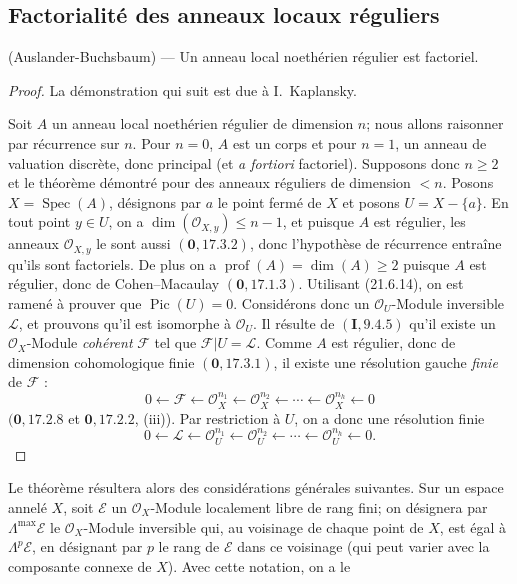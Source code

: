 \subsection{Factorialité des anneaux locaux réguliers}
\label{subsection:IV.21.11}
\label{IV.21.11}

\begin{theorem}[21.11.1]
\label{IV.21.11.1}
\textup{(Auslander-Buchsbaum)} ---
Un anneau local noethérien régulier est factoriel.
\end{theorem}

\begin{proof}
La démonstration qui suit est due à I.~Kaplansky.

Soit $A$ un anneau local noethérien régulier de dimension $n$; nous allons raisonner
par récurrence sur $n$. Pour $n=0$, $A$ est un corps et pour $n=1$, un anneau de
valuation discrète, donc principal (et \emph{a fortiori} factoriel). Supposons donc
$n\geq2$ et le théorème démontré pour des anneaux réguliers de dimension $<n$.
Posons $X=\operatorname{Spec}(A)$, désignons par $a$ le point fermé de $X$ et posons
$U=X-\{a\}$. En tout point $y\in U$, on a
$\dim(\mathcal O_{X,y})\leq n-1$, et puisque $A$ est régulier, les anneaux
$\mathcal O_{X,y}$ le sont aussi $(\mathbf 0, 17.3.2)$, donc l'hypothèse de
récurrence entraîne qu'ils sont factoriels. De plus on a
$\operatorname{prof}(A)=\dim(A)\geq2$ puisque $A$ est régulier, donc de
Cohen--Macaulay $(\mathbf 0, 17.1.3)$.
Utilisant (21.6.14), on est ramené à prouver que $\operatorname{Pic}(U)=0$.
Considérons donc un $\mathcal O_U$-Module inversible $\mathscr L$, et prouvons qu'il
est isomorphe à $\mathcal O_U$. Il résulte de $(\mathbf I, 9.4.5)$ qu'il existe un
$\mathcal O_X$-Module \emph{cohérent} $\mathscr F$ tel que
$\mathscr F|U=\mathscr L$. Comme $A$ est régulier, donc de dimension cohomologique
finie $(\mathbf 0, 17.3.1)$, il existe une résolution gauche \emph{finie} de
$\mathscr F$ :
\[
  0\leftarrow\mathscr F\leftarrow\mathcal O_X^{n_1}
  \leftarrow\mathcal O_X^{n_2}\leftarrow\cdots
  \leftarrow\mathcal O_X^{n_h}\leftarrow0
\]
$(\mathbf 0, 17.2.8$ et $\mathbf 0, 17.2.2$, (iii)). Par restriction à $U$, on a
donc une résolution finie
\[
\label{IV.21.11.1.1}
  0\leftarrow\mathscr L\leftarrow\mathcal O_U^{n_1}
  \leftarrow\mathcal O_U^{n_2}\leftarrow\cdots
  \leftarrow\mathcal O_U^{n_h}\leftarrow0.
  \tag{21.11.1.1}
\]
\end{proof}

Le théorème résultera alors des considérations générales suivantes. Sur un espace
annelé $X$, soit $\mathscr E$ un $\mathcal O_X$-Module localement libre de rang fini;
on désignera par $\Lambda^{\max}\mathscr E$ le $\mathcal O_X$-Module inversible qui,
au voisinage de chaque point de $X$, est égal à $\Lambda^p\mathscr E$, en désignant
par $p$ le rang de $\mathscr E$ dans ce voisinage (qui peut varier avec la composante
connexe de $X$). Avec cette notation, on a le

